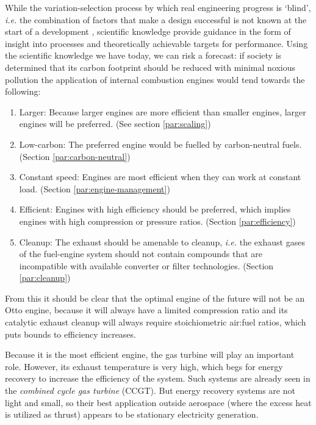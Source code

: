 While the variation-selection process by which real engineering progress is
`blind', \textit{i.e.} the combination of factors that make a design successful
is not known at the start of a development \autocite{Vincenti1990}, scientific
knowledge provide guidance in the form of insight into processes and
theoretically achievable targets for performance. Using the scientific knowledge
we have today, we can  risk a forecast: if society is determined that its carbon
footprint should be reduced with minimal noxious pollution the application of
internal combustion engines would tend towards the following:

\begin{enumerate}
  
  \item Larger: Because larger engines are more efficient than smaller engines,
  larger engines will be preferred. (See section \ref{par:scaling})
  
  \item Low-carbon: The preferred engine would be fuelled by carbon-neutral
  fuels. (Section \ref{par:carbon-neutral})
  
  \item Constant speed: Engines are most efficient when they can work at
  constant load. (Section \ref{par:engine-management})
  
  \item Efficient: Engines with high efficiency should be preferred, which
  implies engines with high compression or pressure ratios. (Section
  \ref{par:efficiency})
  
  \item Cleanup: The exhaust should be amenable to cleanup, \textit{i.e.} the
  exhaust gases of the fuel-engine system should not contain compounds that are
  incompatible with available converter or filter technologies. (Section
  \ref{par:cleanup})
     
\end{enumerate} 

From this it should be clear that the optimal engine of the future will not be
an Otto engine, because it will always have a limited compression ratio and its
catalytic exhaust cleanup will always require stoichiometric air:fuel ratios,
which puts bounds to efficiency increases.

Because it is the most efficient engine, the gas turbine will play an important
role. However, its exhaust temperature is very high, which begs for energy
recovery to increase the efficiency of the system. Such systems are already seen
in the \textit{combined cycle gas turbine} (CCGT). But energy recovery systems
are not light and small, so their best application outside aerospace (where the
excess heat is utilized as thrust) appears to be stationary electricity
generation.

